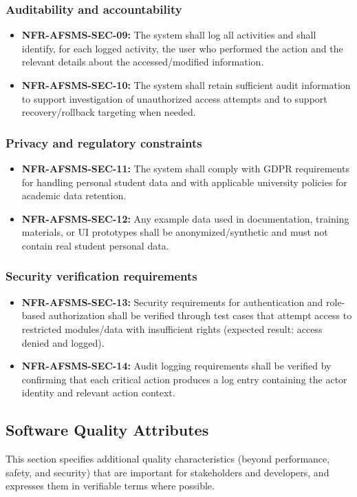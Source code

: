 \documentclass[11pt, a4paper]{article}
\begin{document}
\subsubsection{Auditability and accountability}
\begin{itemize}
    \item \textbf{NFR-AFSMS-SEC-09:} The system shall log all activities and shall identify, for each logged activity, the user who performed the action and the relevant details about the accessed/modified information.
    \item \textbf{NFR-AFSMS-SEC-10:} The system shall retain sufficient audit information to support investigation of unauthorized access attempts and to support recovery/rollback targeting when needed.
\end{itemize}

\subsubsection{Privacy and regulatory constraints}
\begin{itemize}
    \item \textbf{NFR-AFSMS-SEC-11:} The system shall comply with GDPR requirements for handling personal student data and with applicable university policies for academic data retention.
    \item \textbf{NFR-AFSMS-SEC-12:} Any example data used in documentation, training materials, or UI prototypes shall be anonymized/synthetic and must not contain real student personal data.
\end{itemize}

\subsubsection{Security verification requirements}
\begin{itemize}
    \item \textbf{NFR-AFSMS-SEC-13:} Security requirements for authentication and role-based authorization shall be verified through test cases that attempt access to restricted modules/data with insufficient rights (expected result: access denied and logged).
    \item \textbf{NFR-AFSMS-SEC-14:} Audit logging requirements shall be verified by confirming that each critical action produces a log entry containing the actor identity and relevant action context.
\end{itemize}

\subsection{Software Quality Attributes}
This section specifies additional quality characteristics (beyond performance, safety, and security) that are important for stakeholders and developers, and expresses them in verifiable terms where possible.
\end{document}

